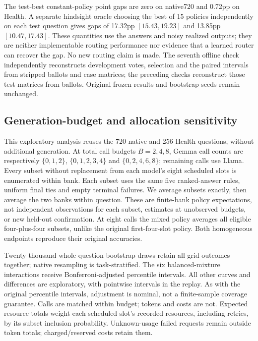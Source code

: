 The test-best constant-policy point gaps are zero on native720 and 0.72pp on Health. A separate hindsight oracle choosing the best of 15 policies independently on each test question gives gaps of 17.32pp $[15.43,19.23]$ and 13.85pp $[10.47,17.43]$. These quantities use the answers and noisy realized outputs; they are neither implementable routing performance nor evidence that a learned router can recover the gap. No new routing claim is made. The seventh offline check independently reconstructs development votes, selection and the paired intervals from stripped ballots and case matrices; the preceding checks reconstruct those test matrices from ballots. Original frozen results and bootstrap seeds remain unchanged.

\subsection{Generation-budget and allocation sensitivity}\label{app:allocation_budget}

This exploratory analysis reuses the 720 native and 256 Health questions, without additional generation. At total call budgets $B=2,4,8$, Gemma call counts are respectively $\{0,1,2\}$, $\{0,1,2,3,4\}$ and $\{0,2,4,6,8\}$; remaining calls use Llama. Every subset without replacement from each model's eight scheduled slots is enumerated within bank. Each subset uses the same five ranked-answer rules, uniform final ties and empty terminal failures. We average subsets exactly, then average the two banks within question. These are finite-bank policy expectations, not independent observations for each subset, estimates at unobserved budgets, or new held-out confirmation. At eight calls the mixed policy averages all eligible four-plus-four subsets, unlike the original first-four-slot policy. Both homogeneous endpoints reproduce their original accuracies.

Twenty thousand whole-question bootstrap draws retain all grid outcomes together; native resampling is task-stratified. The six balanced-mixture interactions receive Bonferroni-adjusted percentile intervals. All other curves and differences are exploratory, with pointwise intervals in the replay. As with the original percentile intervals, adjustment is nominal, not a finite-sample coverage guarantee. Calls are matched within budget; tokens and costs are not. Expected resource totals weight each scheduled slot's recorded resources, including retries, by its subset inclusion probability. Unknown-usage failed requests remain outside token totals; charged/reserved costs retain them.

